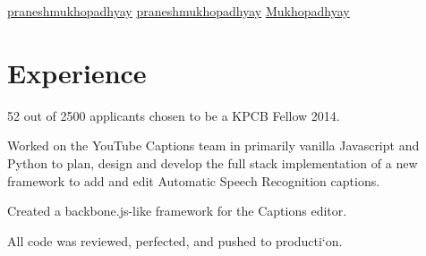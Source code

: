 \documentclass[]{deedy-resume-openfont}
\begin{document}
%
%
\lastupdated

%
%




\href{https://www.linkedin.com/in/praneshmukhopadhyay/}{ praneshmukhopadhyay}
\href{https://www.kaggle.com/praneshmukhopadhyay}{ praneshmukhopadhyay}
\href{https://github.com/Mukhopadhyay}{ Mukhopadhyay}



\section{Experience}

\vspace{\topsep} %
\begin{tightemize}
\item 52 out of 2500 applicants chosen to be a KPCB Fellow 2014.
\end{tightemize}
\sectionsep

\begin{tightemize}
\item Worked on the YouTube Captions team in primarily vanilla Javascript and Python to plan, design and develop the full stack implementation of a new framework to add and edit Automatic Speech Recognition captions.
\item Created a backbone.js-like framework for the Captions editor.
\item All code was reviewed, perfected, and pushed to producti`on.
\end{tightemize}
\sectionsep
\end{document}
